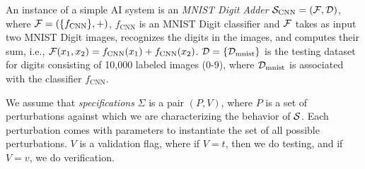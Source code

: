     







\begin{example}
  \label{ex:mnist-adder}
  An instance of a simple AI system is an \emph{MNIST Digit Adder} $\S_{\text{CNN}} = (\F,\D)$, where $\F = (\{f_{\text{CNN}}\}, +)$, $f_{\text{CNN}}$ is an MNIST Digit classifier and $\F$ takes as input two MNIST Digit images, recognizes the digits in the images, and computes their sum, i.e., $\F(x_1,x_2) = f_{\text{CNN}}(x_1) + f_{\text{CNN}}(x_2)$. $\D = \{ \D_{\text{mnist}} \}$ is the testing dataset for digits consisting of 10,000 labeled images (0-9), where $\D_{\text{mnist}}$ is associated with the classifier $f_{\text{CNN}}$.
  \end{example}
  
  We assume that \emph{specifications} $\Sigma$ is a pair $(P, V)$, where $P$ is a set of perturbations against which we are characterizing the behavior of $\S$. Each perturbation comes with parameters to instantiate the set of all possible perturbations. $V$ is a validation flag, where if $V=t$, then we do testing, and if $V=v$, we do verification.
  
